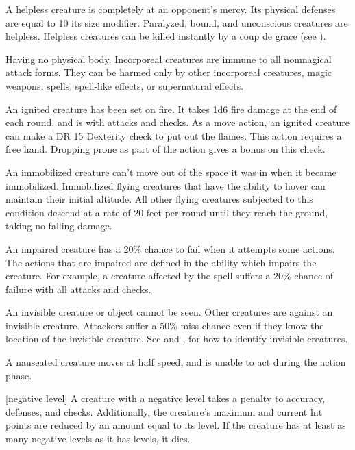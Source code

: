  A helpless creature is completely at an opponent's mercy. Its physical defenses are equal to 10 \add its size modifier. Paralyzed, bound, and unconscious creatures are helpless. Helpless creatures can be killed instantly by a coup de grace (see ).

 Having no physical body. Incorporeal creatures are immune to all nonmagical attack forms. They can be harmed only by other incorporeal creatures, magic weapons, spells, spell-like effects, or supernatural effects.

 An ignited creature has been set on fire. It takes 1d6 fire damage at the end of each round, and is \impaired with attacks and checks. As a move action, an ignited creature can make a DR 15 Dexterity check to put out the flames. This action requires a free hand. Dropping prone as part of the action gives a  bonus on this check.

 An immobilized creature can't move out of the space it was in when it became immobilized. Immobilized flying creatures that have the ability to hover can maintain their initial altitude. All other flying creatures subjected to this condition descend at a rate of 20 feet per round until they reach the ground, taking no falling damage.

 An impaired creature has a 20\% chance to fail when it attempts some actions. The actions that are impaired are defined in the ability which impairs the creature. For example, a creature affected by the  spell suffers a 20\% chance of failure with all attacks and checks.

 An invisible creature or object cannot be seen. Other creatures are  against an invisible creature. Attackers suffer a 50\% miss chance even if they know the location of the invisible creature. See  and , for how to identify invisible creatures.


 A nauseated creature moves at half speed, and is unable to act during the action phase.

[negative level] A creature with a negative level takes a  penalty to accuracy, defenses, and checks. Additionally, the creature's maximum and current hit points are reduced by an amount equal to its level. If the creature has at least as many negative levels as it has levels, it dies.


